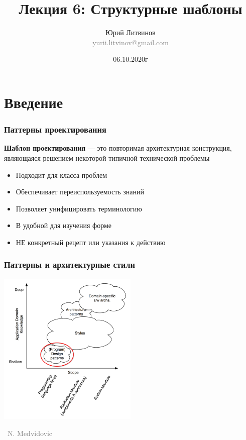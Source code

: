\documentclass[xetex,mathserif,serif]{beamer}
\title[Структурные шаблоны]{Лекция 6: Структурные шаблоны}
\author[Юрий Литвинов]{Юрий Литвинов\\\small{\textcolor{gray}{yurii.litvinov@gmail.com}}}
\date{06.10.2020г}
\newcommand{\attribution}[1] {
	\vspace{-5mm}\begin{flushright}\begin{scriptsize}\textcolor{gray}{\textcopyright\, #1}\end{scriptsize}\end{flushright}
}
\begin{document}
	\frame{\titlepage}

	\section{Введение}

	\begin{frame}
		\frametitle{Паттерны проектирования}
		\textbf{Шаблон проектирования} --- это повторимая архитектурная конструкция, являющаяся решением некоторой типичной технической проблемы
		\begin{itemize}
			\item Подходит для класса проблем
			\item Обеспечивает переиспользуемость знаний
			\item Позволяет унифицировать терминологию
			\item В удобной для изучения форме
			\item НЕ конкретный рецепт или указания к действию
		\end{itemize}
	\end{frame}

	\begin{frame}
		\frametitle{Паттерны и архитектурные стили}
		\begin{center}
			\includegraphics[width=0.5\textwidth]{architecturalStylesPatternsHighlighted.png}
			\attribution{N. Medvidovic}
		\end{center}
	\end{frame}
\end{document}
